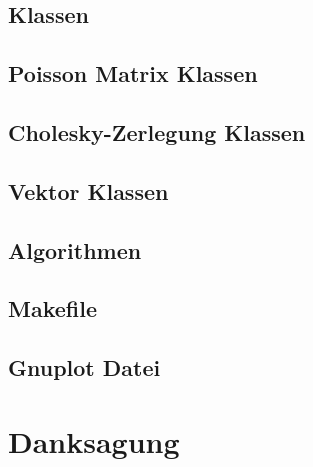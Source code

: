 \section{Klassen}
\section{Poisson Matrix Klassen}
\section{Cholesky-Zerlegung Klassen}
\section{Vektor Klassen}
\section{Algorithmen}
\section{Makefile}
\section{Gnuplot Datei}

\chapter*{Danksagung}


